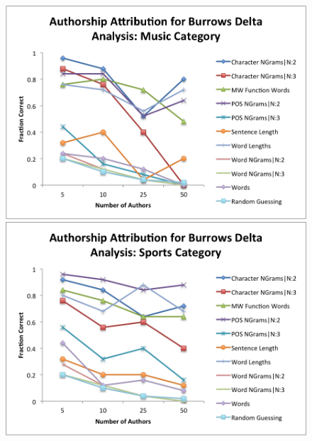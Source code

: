 \documentclass[pageno]{jpaper}
\begin{document}
\begin{figure}[h!]
\begin{center}
\includegraphics*[scale=.75]{BDMusic}
\includegraphics*[scale=.75]{BDSports}
\end{center}
\label{fig:BDCategories2}
\end{figure}
\end{document}
